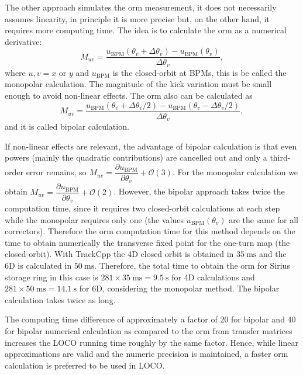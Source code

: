 The other approach simulates the \gls{orm} measurement, it does not necessarily assumes linearity, in principle it is more precise but, on the other hand, it requires more computing time. The idea is to calculate the \gls{orm} as a numerical derivative:
\begin{equation}
    M_{uv} = \dfrac{u_{\mathrm{BPM}}\left(\theta_v + \Delta \theta_v\right)-u_{\mathrm{BPM}}\left(\theta_v \right)}{\Delta \theta_v},
    \label{eq:unipolar_respm}
\end{equation}
where $u, v = x$ or $y$ and $u_{\mathrm{BPM}}$ is the closed-orbit at BPMs, this is be called the monopolar calculation. The magnitude of the kick variation must be small enough to avoid non-linear effects. The \gls{orm} also can be calculated as
\begin{equation}
    M_{uv} = \dfrac{u_{\mathrm{BPM}}\left(\theta_v + \Delta \theta_v/2\right)-u_{\mathrm{BPM}}\left(\theta_v- \Delta \theta_v/2\right)}{\Delta \theta_v},
    \label{eq:bipolar_respm}
\end{equation}
and it is called bipolar calculation.

If non-linear effects are relevant, the advantage of bipolar calculation is that even powers (mainly the quadratic contributions) are cancelled out and only a third-order error remains, so $M_{uv} = \dfrac{\partial u_{\mathrm{BPM}}}{\partial \theta_v} + \mathcal{O}(3)$. For the monopolar calculation we obtain $M_{uv} = \dfrac{\partial u_{\mathrm{BPM}}}{\partial \theta_v} + \mathcal{O}(2)$. However, the bipolar approach takes twice the computation time, since it requires two closed-orbit calculations at each step while the monopolar requires only one (the values $u_{\mathrm{BPM}}\left(\theta_v \right)$ are the same for all correctors). Therefore the \gls{orm} computation time for this method depends on the time to obtain numerically the transverse fixed point for the one-turn map (the closed-orbit). With TrackCpp the 4D closed orbit is obtained in $\SI{35}{\milli\second}$ and the 6D is calculated in $\SI{50}{\milli\second}$. Therefore, the total time to obtain the \gls{orm} for Sirius storage ring in this case is $281 \times \SI{35}{\milli\second} = \SI{9.5}{\second}$ for 4D calculations and $281 \times \SI{50}{\milli\second} = \SI{14.1}{\second}$ for 6D, considering the monopolar method. The bipolar calculation takes twice as long.

The computing time difference of approximately a factor of 20 for bipolar and 40 for bipolar numerical calculation as compared to the \gls{orm} from transfer matrices increases the LOCO running time roughly by the same factor. Hence, while linear approximations are valid and the numeric precision is maintained, a faster \gls{orm} calculation is preferred to be used in LOCO.

